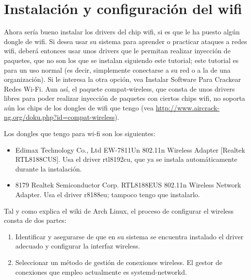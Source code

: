 \section{Instalación y configuración del wifi}\label{sec:rasp-wifi}
Ahora sería bueno instalar los drivers del chip wifi, si es que le ha puesto algún dongle de wifi. Si desea usar
su sistema para aprender o practicar ataques a redes wifi, deberá entonces usar unos drivers que le permitan
realizar inyección de paquetes, que no son los que se instalan siguiendo este tutorial; este tutorial es para un
uso normal (es decir, simplemente conectarse a su red o a la de una organización). Si le interesa la otra
opción, vea Instalar Software Para Crackear Redes Wi-Fi. Aun así, el paquete compat-wireless, que consta de unos
drivers libres para poder realizar inyección de paquetes con ciertos chips wifi, no soporta aún los chips de
los dongles de wifi que tengo (vea \url{http://www.aircrack-ng.org/doku.php?id=compat-wireless}).

Los dongles que tengo para wi-fi son los siguientes:

\begin{itemize}

  \item Edimax Technology Co., Ltd EW-7811Un 802.11n Wireless Adapter [Realtek RTL8188CUS]. Usa el driver
    rtl8192cu, que ya se instala automáticamente durante la instalación.

  \item 8179 Realtek Semiconductor Corp. RTL8188EUS 802.11n Wireless Network Adapter. Usa el driver r8188eu;
    tampoco tengo que instalarlo.

\end{itemize}

Tal y como explica el wiki de Arch Linux, el proceso de configurar el wireless consta de dos partes:

\begin{enumerate}

  \item Identificar y asegurarse de que en su sistema se encuentra instalado el driver adecuado y configurar la
    interfaz wireless.

  \item Seleccionar un método de gestión de conexiones wireless. El gestor de conexiones que empleo actualmente
    es systemd-networkd.

\end{enumerate}

